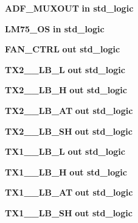 \begin{DoxyCompactItemize}
\item 
{\bf A\+D\+F\+\_\+\+M\+U\+X\+O\+UT}  {\bfseries {\bfseries \textcolor{keywordflow}{in}\textcolor{vhdlchar}{ }}} {\bfseries \textcolor{comment}{std\+\_\+logic}\textcolor{vhdlchar}{ }} 
\item 
{\bf L\+M75\+\_\+\+OS}  {\bfseries {\bfseries \textcolor{keywordflow}{in}\textcolor{vhdlchar}{ }}} {\bfseries \textcolor{comment}{std\+\_\+logic}\textcolor{vhdlchar}{ }} 
\item 
{\bf F\+A\+N\+\_\+\+C\+T\+RL}  {\bfseries {\bfseries \textcolor{keywordflow}{out}\textcolor{vhdlchar}{ }}} {\bfseries \textcolor{comment}{std\+\_\+logic}\textcolor{vhdlchar}{ }} 
\item 
{\bf T\+X2\+\_\+\_\+\+L\+B\+\_\+L}  {\bfseries {\bfseries \textcolor{keywordflow}{out}\textcolor{vhdlchar}{ }}} {\bfseries \textcolor{comment}{std\+\_\+logic}\textcolor{vhdlchar}{ }} 
\item 
{\bf T\+X2\+\_\+\_\+\+L\+B\+\_\+H}  {\bfseries {\bfseries \textcolor{keywordflow}{out}\textcolor{vhdlchar}{ }}} {\bfseries \textcolor{comment}{std\+\_\+logic}\textcolor{vhdlchar}{ }} 
\item 
{\bf T\+X2\+\_\+\_\+\+L\+B\+\_\+\+AT}  {\bfseries {\bfseries \textcolor{keywordflow}{out}\textcolor{vhdlchar}{ }}} {\bfseries \textcolor{comment}{std\+\_\+logic}\textcolor{vhdlchar}{ }} 
\item 
{\bf T\+X2\+\_\+\_\+\+L\+B\+\_\+\+SH}  {\bfseries {\bfseries \textcolor{keywordflow}{out}\textcolor{vhdlchar}{ }}} {\bfseries \textcolor{comment}{std\+\_\+logic}\textcolor{vhdlchar}{ }} 
\item 
{\bf T\+X1\+\_\+\_\+\+L\+B\+\_\+L}  {\bfseries {\bfseries \textcolor{keywordflow}{out}\textcolor{vhdlchar}{ }}} {\bfseries \textcolor{comment}{std\+\_\+logic}\textcolor{vhdlchar}{ }} 
\item 
{\bf T\+X1\+\_\+\_\+\+L\+B\+\_\+H}  {\bfseries {\bfseries \textcolor{keywordflow}{out}\textcolor{vhdlchar}{ }}} {\bfseries \textcolor{comment}{std\+\_\+logic}\textcolor{vhdlchar}{ }} 
\item 
{\bf T\+X1\+\_\+\_\+\+L\+B\+\_\+\+AT}  {\bfseries {\bfseries \textcolor{keywordflow}{out}\textcolor{vhdlchar}{ }}} {\bfseries \textcolor{comment}{std\+\_\+logic}\textcolor{vhdlchar}{ }} 
\item 
{\bf T\+X1\+\_\+\_\+\+L\+B\+\_\+\+SH}  {\bfseries {\bfseries \textcolor{keywordflow}{out}\textcolor{vhdlchar}{ }}} {\bfseries \textcolor{comment}{std\+\_\+logic}\textcolor{vhdlchar}{ }} 
\item 

\end{DoxyCompactItemize}
